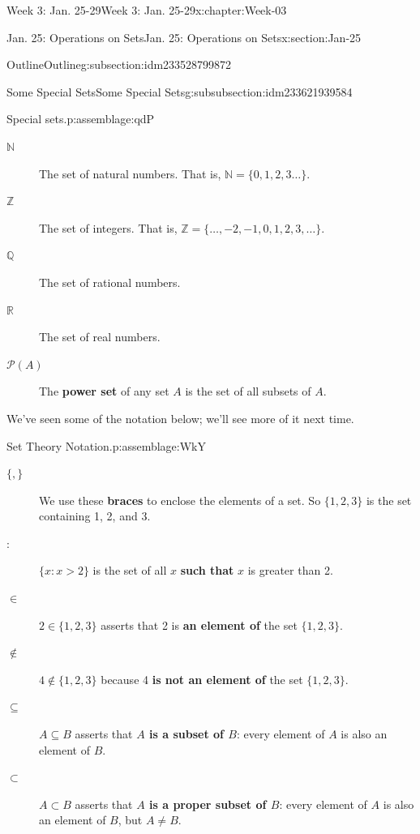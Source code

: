 \documentclass[oneside,10pt,]{book}
\newcommand{\terminology}[1]{\textbf{#1}}
\numberwithin{equation}{section}
\def\Z{{\mathbb Z}}
\def\Q{{\mathbb Q}}
\def\N{{\mathbb N}}
\def\pow{{\mathcal P}}
\def\R{{\mathbb R}}
\newcommand{\N}{\mathbb N}
\newcommand{\Z}{\mathbb Z}
\newcommand{\Q}{\mathbb Q}
\newcommand{\R}{\mathbb R}
\newcommand{\pow}{\mathcal P}
\newcommand{\st}{:}
\begin{document}
\begin{chapterptx}{Week 3: Jan. 25-29}{}{Week 3: Jan. 25-29}{}{}{x:chapter:Week-03}
\begin{sectionptx}{Jan. 25: Operations on Sets}{}{Jan. 25: Operations on Sets}{}{}{x:section:Jan-25}
\begin{subsectionptx}{Outline}{}{Outline}{}{}{g:subsection:idm233528799872}
\begin{subsubsectionptx}{Some Special Sets}{}{Some Special Sets}{}{}{g:subsubsection:idm233621939584}
\begin{assemblage}{Special sets.}{p:assemblage:qdP}
\begin{description}
\item[{\(\N\)}]The set of natural numbers. That is, \(\N = \{0, 1, 2, 3\ldots\}\). \label{g:notation:idm233622083520}%
\item[{\(\Z\)}]The set of integers. That is, \(\Z = \{\ldots, -2, -1, 0, 1, 2, 3, \ldots\}\). \label{g:notation:idm233622211568}%
\item[{\(\Q\)}]The set of rational numbers. \label{g:notation:idm233621247632}%
\item[{\(\R\)}]The set of real numbers. \label{g:notation:idm233621071648}%
\item[{\(\pow(A)\)}]The \terminology{power set} of any set \(A\) is the set of all subsets of \(A\). \label{g:notation:idm233535144512}%
\end{description}
%
\end{assemblage}
We've seen some of the notation below; we'll see more of it next time.%
\begin{assemblage}{Set Theory Notation.}{p:assemblage:WkY}%
%
\begin{description}
\item[{\(\{, \}\)}]We use these \terminology{braces} to enclose the elements of a set. So \(\{1,2,3\}\) is the set containing 1, 2, and 3. \label{g:notation:idm233535138080}%
\item[{\(\st\)}]\(\{x \st x > 2\}\) is the set of all \(x\) \terminology{such that} \(x\) is greater than 2. \label{g:notation:idm233535134208}%
\item[{\(\in\)}]\(2 \in \{1,2,3\}\) asserts that 2 is \terminology{an element of} the set \(\{1,2,3\}\). \label{g:notation:idm233535130880}%
\item[{\(\not\in\)}]\(4 \notin \{1,2,3\}\) because 4 \terminology{is not an element of} the set \(\{1,2,3\}\).%
\item[{\(\subseteq\)}]\(A \subseteq B\) asserts that \terminology{\(A\) is a subset of \(B\)}: every element of \(A\) is also an element of \(B\). \label{g:notation:idm233535123520}%
\item[{\(\subset\)}]\(A \subset B\) asserts that \terminology{\(A\) is a proper subset of \(B\)}: every element of \(A\) is also an element of \(B\), but \(A \ne B\). \label{g:notation:idm233535118560}%

\end{description}
\end{assemblage}
\end{subsubsectionptx}
\end{subsectionptx}
\end{sectionptx}
\end{chapterptx}
\end{document}

